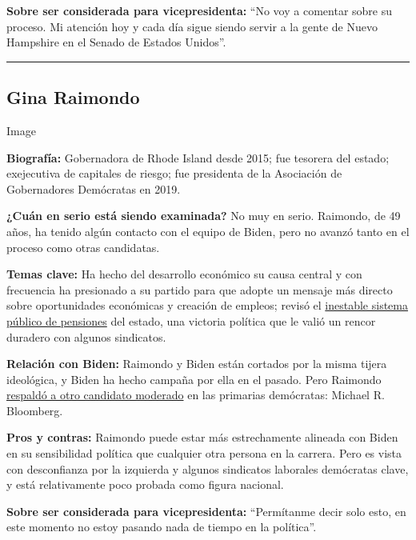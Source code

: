 \textbf{Sobre ser considerada para vicepresidenta:} ``No voy a comentar
sobre su proceso. Mi atención hoy y cada día sigue siendo servir a la
gente de Nuevo Hampshire en el Senado de Estados Unidos''.

\begin{center}\rule{0.5\linewidth}{\linethickness}\end{center}

\hypertarget{gina-raimondo}{%
\subsection{Gina Raimondo}\label{gina-raimondo}}

Image

\textbf{Biografía:} Gobernadora de Rhode Island desde 2015; fue tesorera
del estado; exejecutiva de capitales de riesgo; fue presidenta de la
Asociación de Gobernadores Demócratas en 2019.

\textbf{¿Cuán en serio está siendo examinada?} No muy en serio.
Raimondo, de 49 años, ha tenido algún contacto con el equipo de Biden,
pero no avanzó tanto en el proceso como otras candidatas.

\textbf{Temas clave:} Ha hecho del desarrollo económico su causa central
y con frecuencia ha presionado a su partido para que adopte un mensaje
más directo sobre oportunidades económicas y creación de empleos; revisó
el
\href{https://www.nytimes.com/2015/09/26/business/dealbook/rhode-island-averts-pension-disaster-without-raising-taxes.html}{inestable
sistema público de pensiones} del estado, una victoria política que le
valió un rencor duradero con algunos sindicatos.

\textbf{Relación con Biden:} Raimondo y Biden están cortados por la
misma tijera ideológica, y Biden ha hecho campaña por ella en el pasado.
Pero Raimondo
\href{https://www.nytimes.com/2019/11/24/us/politics/michael-bloomberg-2020-presidency.html}{respaldó
a otro candidato moderado} en las primarias demócratas: Michael R.
Bloomberg.

\textbf{Pros y contras:} Raimondo puede estar más estrechamente alineada
con Biden en su sensibilidad política que cualquier otra persona en la
carrera. Pero es vista con desconfianza por la izquierda y algunos
sindicatos laborales demócratas clave, y está relativamente poco probada
como figura nacional.

\textbf{Sobre ser considerada para vicepresidenta:} ``Permítanme decir
solo esto, en este momento no estoy pasando nada de tiempo en la
política''.

